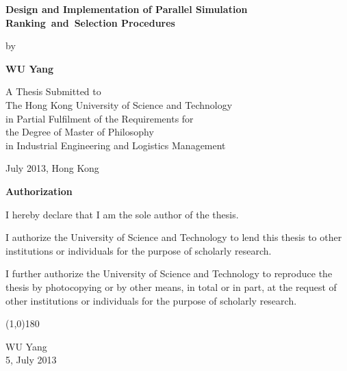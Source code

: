 \documentclass[12pt,a4paper]{report}
\begin{document}

\null\vspace{0.5in}
\begin{center}
{\Large\bf Design and Implementation of Parallel Simulation Ranking~and~Selection Procedures}
\vspace{2.5cm}

{\large by}
\vspace{0.5cm}

{\large\bf WU Yang}\normalsize
\vspace{1cm}

A Thesis Submitted to \\
The Hong Kong University of Science and Technology \\
in Partial Fulfilment of the Requirements for \\
the Degree of Master of Philosophy \\
in Industrial Engineering and Logistics Management
\vspace{1.5cm}

July 2013, Hong Kong
\end{center}
\thispagestyle{empty}
\newpage

\begin{center}{\Large\bf Authorization}\normalsize
\end{center}
\vspace{0.5cm}

I hereby declare that I am the sole author of the thesis.

\vspace{0.5cm}

I authorize the University of Science and Technology to lend this thesis
to other institutions or individuals for the purpose of scholarly research.

\vspace{0.5cm}

I further authorize the University of Science and Technology to
reproduce the thesis by photocopying or by other means, in total or in
part, at the request of other institutions or individuals for the
purpose of scholarly research.

\vspace{1.5cm}

\begin{center}
\line(1,0){180}
\smallskip

WU Yang \\
5, July 2013
\end{center}
\end{document}
